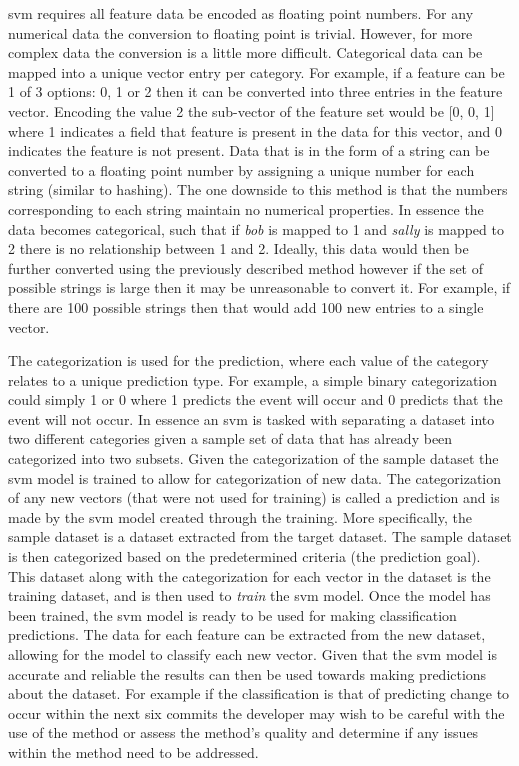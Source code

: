 \gls{svm} requires all feature data be encoded as floating point numbers. For any numerical data the conversion to floating point is trivial. However, for more complex data the conversion is a little more difficult. Categorical data can be mapped into a unique vector entry per category. For example, if a feature can be 1 of 3 options: 0, 1 or 2 then it can be converted into three entries in the feature vector. Encoding the value 2 the sub-vector of the feature set would be [0, 0, 1] where 1 indicates a field that feature is present in the data for this vector, and 0 indicates the feature is not present. Data that is in the form of a string can be converted to a floating point number by assigning a unique number for each string (similar to hashing). The one downside to this method is that the numbers corresponding to each string maintain no numerical properties. In essence the data becomes categorical, such that if \textit{bob} is mapped to 1 and \textit{sally} is mapped to 2 there is no relationship between 1 and 2. Ideally, this data would then be further converted using the previously described method however if the set of possible strings is large then it may be unreasonable to convert it. For example, if there are 100 possible strings then that would add 100 new entries to a single vector.


The categorization is used for the prediction, where each value of the category relates to a unique prediction type. For example, a simple binary categorization could simply 1 or 0 where 1 predicts the event will occur and 0 predicts that the event will not occur. In essence an \gls{svm} is tasked with separating a dataset into two different categories given a sample set of data that has already been categorized into two subsets. Given the categorization of the sample dataset the \gls{svm} model is trained to allow for categorization of new data. The categorization of any new vectors (that were not used for training) is called a prediction and is made by the \gls{svm} model created through the training. More specifically, the sample dataset is a dataset extracted from the target dataset. The sample dataset is then categorized based on the predetermined criteria (the prediction goal). This dataset along with the categorization for each vector in the dataset is the training dataset, and is then used to \textit{train} the \gls{svm} model. Once the model has been trained, the \gls{svm} model is ready to be used for making classification predictions. The data for each feature can be extracted from the new dataset, allowing for the model to classify each new vector. Given that the \gls{svm} model is accurate and reliable the results can then be used towards making predictions about the dataset. For example if the classification is that of predicting change to occur within the next six commits the developer may wish to be careful with the use of the method or assess the method's quality and determine if any issues within the method need to be addressed.

